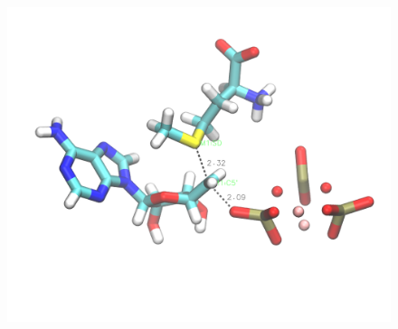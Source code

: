 \documentclass[journal=jpcbfk,manuscript=article,layout=twocolumn]{achemso}
\begin{document}
\begin{figure}[ht!]
\includegraphics[scale=0.2]{figures/mat2a-transition-state.png}
\end{figure}
\end{document}
